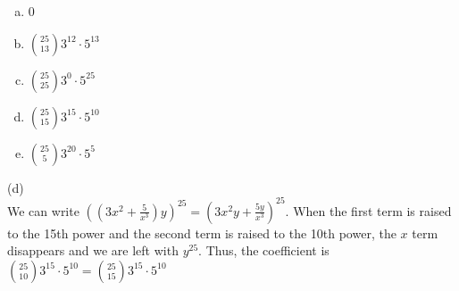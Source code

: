 \begin{enumerate}[(a)]
	\item  0

	\item  $\binom{25}{13}3^{12}\cdot 5^{13}$

	\item  $\binom{25}{25}3^{0}\cdot 5^{25}$

	\item  $\binom{25}{15}3^{15}\cdot 5^{10}$

	\item  $\binom{25}{5}3^{20}\cdot 5^{5}$

\end{enumerate}
\begin{solution}

(d) \\
We can write $((3x^2+\frac{5}{x^3})y)^{25}=(3x^2y+\frac{5y}{x^3})^{25}$. When the first term is raised to the 15th power and the second term is raised to the 10th power, the $x$ term disappears and we are left with $y^{25}$. Thus, the coefficient is $\binom{25}{10}3^{15}\cdot 5^{10}=\binom{25}{15}3^{15}\cdot 5^{10}$

\end{solution}


